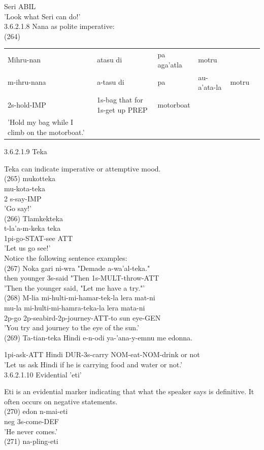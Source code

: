 \documentclass[10pt]{article}
\begin{document}
Seri ABIL\\
'Look what Seri can do!'\\
3.6.2.1.8 Nana as polite imperative:\\
(264)

\begin{center}
\begin{tabular}{llllll}
Mihru-nan & atasu di & pa aga'atla & motru &  \\
m-ihru-nana & a-tasu di & pa & au-a'ata-la & motru \\
2s-hold-IMP & 1s-bag that for 1s-get up PREP & motorboat &  &  \\
'Hold my bag while I climb on the motorboat.' &  &  &  &  \\
\end{tabular}
\end{center}

3.6.2.1.9 Teka

Teka can indicate imperative or attemptive mood.\\
(265) mukotteka\\
mu-kota-teka\\
2 s-say-IMP\\
'Go say!'\\
(266) Tlamkekteka\\
t-la'a-m-keka teka\\
1pi-go-STAT-see ATT\\
'Let us go see!'\\
Notice the following sentence examples:\\
(267) Noka gari ni-wra "Demade a-wa'al-teka."\\
then younger 3s-said "Then 1s-MULT-throw-ATT\\
'Then the younger said, "Let me have a try."'\\
(268) M-lia mi-hulti-mi-hamar-tek-la lera mat-ni\\
mu-la mi-hulti-mi-hamra-teka-la lera mata-ni\\
2p-go 2p-seabird-2p-journey-ATT-to sun eye-GEN\\
'You try and journey to the eye of the sun.'\\
(269) Ta-tian-teka Hindi e-n-odi ya-'ana-y-emnu me edonna.

1pi-ask-ATT Hindi DUR-3s-carry NOM-eat-NOM-drink or not\\
'Let us ask Hindi if he is carrying food and water or not.'\\
3.6.2.1.10 Evidential 'eti'

Eti is an evidential marker indicating that what the speaker says is definitive. It often occurs on negative statements.\\
(270) edon n-mai-eti\\
neg 3s-come-DEF\\
'He never comes.'\\
(271) na-pling-eti
\end{document}
